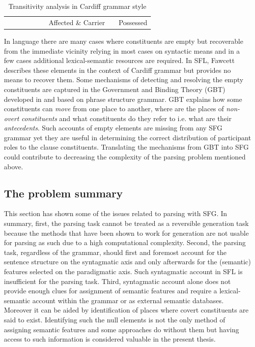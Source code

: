\begin{table}[!ht]
{\begin{tabular}{cccccc|c|c|c|c|c|}
            &                             &                                      &                         &                                     &                & Affected \& Carrier &                  & \multicolumn{3}{c|}{Possessed}                 \\ \cline{7-7} \cline{9-11} 
        \end{tabular}%
    }
    \caption{Transitivity analysis in Cardiff grammar style \citep{Neale2002,Fawcett2009}}
    \label{tab:glance-analsys-semantic}
\end{table}

In language there are many cases where constituents are empty but recoverable from the immediate vicinity relying in most cases on syntactic means and in a few cases additional lexical-semantic resources are required. In SFL, Fawcett describes these elements in the context of Cardiff grammar \citep[115,135,194]{Fawcett2008} but provides no means to recover them. Some mechanisms of detecting and resolving the empty constituents are captured in the Government and Binding Theory (GBT) developed in \citep{Chomsky81, Chomsky1982, Chomsky1986} and based on phrase structure grammar. GBT explains how some constituents can \textit{move} from one place to another, where are the places of \textit{non-overt constituents} and what constituents do they refer to i.e. what are their \textit{antecedents}. Such accounts of empty elements are missing from any SFG grammar yet they are useful in determining the correct distribution of participant roles to the clause constituents. Translating the mechanisms from GBT into SFG could contribute to decreasing the complexity of the parsing problem mentioned above.


\subsection{The problem summary}

This section has shown some of the issues related to parsing with SFG. In summary, first, the parsing task cannot be treated as a reversible generation task because the methods that have been shown to work for generation are not usable for parsing as such due to a high computational complexity. Second, the parsing task, regardless of the grammar, should first and foremost account for the sentence structure on the syntagmatic axis and only afterwards for the (semantic) features selected on the paradigmatic axis. Such syntagmatic account in SFL is insufficient for the parsing task. Third, syntagmatic account alone does not provide enough clues for assignment of semantic features and require a lexical-semantic account within the grammar or as external semantic databases. Moreover it can be aided by identification of places where covert constituents are said to exist. Identifying such the null elements is not the only method of assigning semantic features and some approaches do without them but having access to such information is considered valuable in the present thesis.


